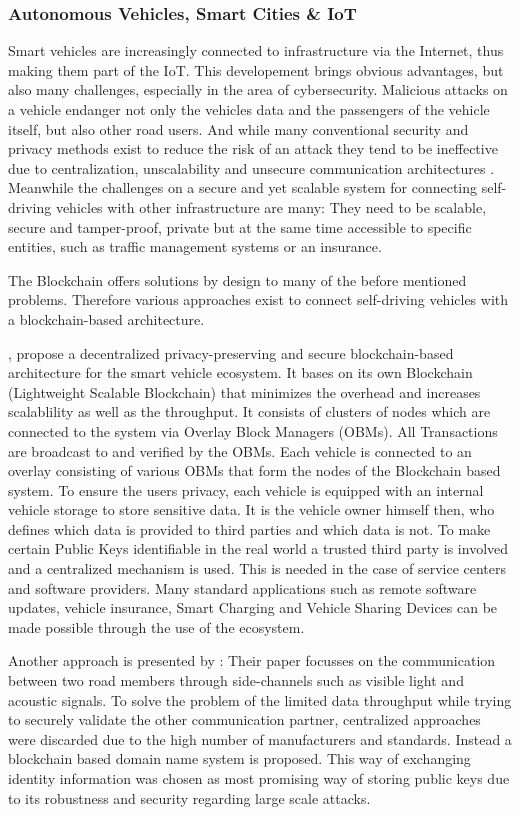 \subsubsection{Autonomous Vehicles, Smart Cities \& IoT}
Smart vehicles are increasingly connected to infrastructure via the Internet, thus making them part of the IoT. This developement brings obvious advantages, but also many challenges, especially in the area of cybersecurity. Malicious attacks on a vehicle endanger not only the vehicles data and the passengers of the vehicle itself, but also other road users. And while many conventional security and privacy methods exist to reduce the risk of an attack they tend to be ineffective due to centralization, unscalability and unsecure communication architectures \cite{DorriSteger2017}.
Meanwhile the challenges on a secure and yet scalable system for connecting self-driving vehicles with other infrastructure are many: They need to be scalable, secure and tamper-proof, private but at the same time accessible to specific entities, such as traffic management systems or an insurance.

The Blockchain offers solutions by design to many of the before mentioned problems. Therefore various approaches exist to connect self-driving vehicles with a blockchain-based architecture.

\citeauthor{DorriSteger2017}, propose a decentralized privacy-preserving and secure blockchain-based architecture for the smart vehicle ecosystem. It bases on its own Blockchain (Lightweight Scalable Blockchain) that minimizes the overhead and increases scalablility as well as the throughput. 
It consists of clusters of nodes which are connected to the system via Overlay Block Managers (OBMs).  All Transactions are broadcast to and verified by the OBMs. Each vehicle is connected to an overlay consisting of various OBMs that form the nodes of the Blockchain based system.
To ensure the users privacy, each vehicle is equipped with an internal vehicle storage to store sensitive data. It is the vehicle owner himself then, who defines which data is provided to third parties and which data is not.
To make certain Public Keys identifiable in the real world a trusted third party is involved and a centralized mechanism is used. This is needed in the case of service centers and software providers.
Many standard applications such as remote software updates, vehicle insurance, Smart Charging and Vehicle Sharing Devices can be made possible through the use of the ecosystem.

Another approach is presented by \citeauthor{Rowan2017}: Their paper focusses on the communication between two road members through side-channels such as visible light and acoustic signals. To solve the problem of the limited data throughput while trying to securely validate the other communication partner, centralized approaches were discarded due to the high number of manufacturers and standards. Instead a blockchain based domain name system is proposed. This way of exchanging identity information was chosen as most promising way of storing public keys due to its robustness and security regarding large scale attacks.

